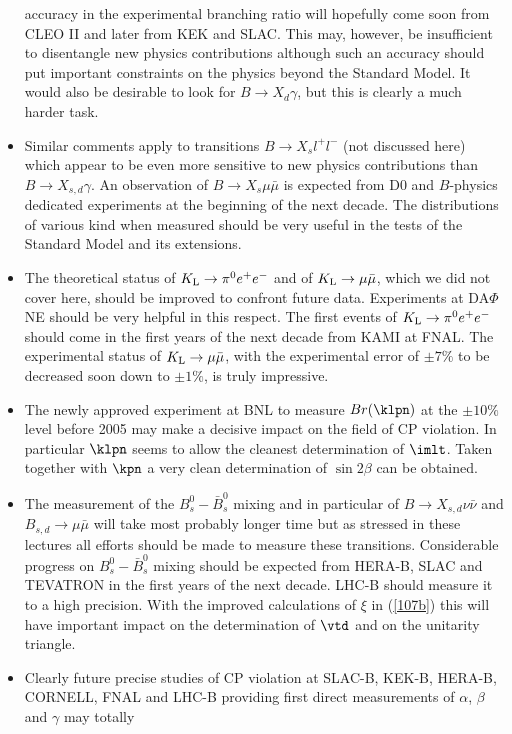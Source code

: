 \begin{itemize}
accuracy in the experimental branching ratio will hopefully
come soon from CLEO II and later from KEK and SLAC. 
This may, however, be insufficient to
disentangle new physics contributions although such an accuracy
should put important constraints on the physics beyond the Standard
Model. It would also be desirable to look for $B \to X_d \gamma$,
but this is clearly a much harder task.
\item
Similar comments apply to transitions $B \to X_s l^+l^-$ (not discussed
here)
which appear to be even  more sensitive to new physics contributions
than $ B \to X_{s,d} \gamma$. An observation of
$B \to X_s \mu\bar\mu$ is expected from D0 and $B$-physics dedicated
experiments at the beginning of the next 
decade. The distributions of various kind when measured should
be very useful in the tests of the Standard Model and its extensions.
\item
The theoretical status of $K_{\rm L}\to \pi^0 e^+ e^-$ and of 
$K_{\rm L}\to \mu\bar\mu$, which we did not cover here, 
should be improved to confront future
data. Experiments at DA$\Phi$NE should be very helpful in this
respect. The first events of $K_{\rm L}\to \pi^0 e^+ e^-$ should
come in the first years of the next decade from KAMI at FNAL.
The experimental status of $K_{\rm L}\to \mu\bar\mu$, with the 
experimental error of $\pm 7\%$ to be decreased soon down to $\pm 1\%$,
is truly impressive.
\item
The newly approved experiment at BNL to
measure $Br(\klpn)$ at the $\pm 10\%$ level before 2005 may make a decisive
impact on the field of CP violation. 
In particular $\klpn$ seems to allow the
cleanest determination of $\imlt$. Taken together with $\kpn$
a very clean determination of $\sin 2 \beta$ can be obtained.
\item
The measurement of the $B^0_s-\bar B^0_s$ mixing and in particular of
$B \to X_{s,d}\nu\bar\nu$ and 
$B_{s,d}\to \mu\bar\mu$ will take most probably longer time but
as stressed in these lectures all efforts should be made to measure
these transitions. Considerable progress on $B^0_s-\bar B^0_s$ mixing
should be expected from HERA-B, SLAC and TEVATRON in the first years
of the next decade. LHC-B should measure it to a high precision.
With the improved calculations of $\xi$ in (\ref{107b}) this will have
important impact on the determination of $\vtd$ and on the
unitarity triangle. 
\item
Clearly future precise studies of CP violation at SLAC-B, KEK-B, 
HERA-B, CORNELL, FNAL and  LHC-B providing first
direct measurements of $\alpha$, $\beta$ and $\gamma$ may totally

\end{itemize}
